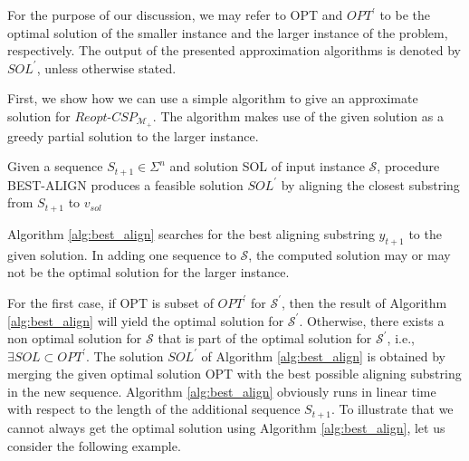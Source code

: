\documentclass[journal]{acm_proc_article-sp}
\begin{document}
For the purpose of our discussion, we may refer to OPT and $OPT^\prime$ to be the optimal solution of the smaller instance and the larger instance of the problem, respectively. The output of the presented approximation algorithms is denoted by $SOL^\prime$, unless otherwise stated. 

First, we show how we can use a  simple algorithm to give an approximate solution for $Reopt$-$CSP_{\mathcal{M}_+}$. The algorithm  makes use of the given solution as a greedy partial solution to the larger instance. 

\begin{algorithm} 
\caption{Given a sequence $S_{t+1} \in \Sigma^n$ and solution SOL of input instance $\mathcal{S}$, procedure BEST-ALIGN produces a feasible solution $SOL^\prime$ by aligning the closest substring from $S_{t+1}$ to $v_{sol}$}
\label{alg:best_align}
\begin{algorithmic}[1]
\EndIf
\EndFor
{}
\EndProcedure
\end{algorithmic}
\end{algorithm}

Algorithm \ref{alg:best_align} searches for the best aligning substring $y_{t+1}$ to the given solution. In adding one sequence to $\mathcal{S}$, the computed solution may or may not be the optimal solution for the larger instance. 

For the first case, if OPT is subset of $OPT^\prime$ for $\mathcal{S}^\prime$, then the result of Algorithm \ref{alg:best_align} will yield the optimal solution for $\mathcal{S}^\prime$. Otherwise, there exists a non optimal solution for $\mathcal{S}$ that is part of the optimal solution for $\mathcal{S}^\prime$, i.e., $\exists SOL \subset  OPT^\prime$. The solution $SOL^\prime$ of Algorithm \ref{alg:best_align} is obtained by merging the given optimal solution OPT with the best possible aligning substring in the new sequence. Algorithm \ref{alg:best_align} obviously runs in linear time with respect to the length of the additional sequence $ S_{t+1}$. 
To illustrate that we cannot always get the optimal solution using Algorithm \ref{alg:best_align}, let us consider the following example.
\end{document}
